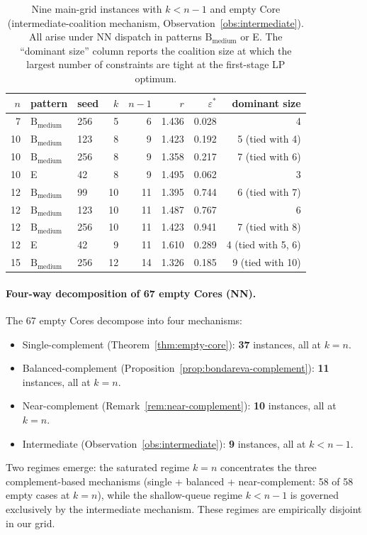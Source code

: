 \documentclass[11pt]{article}
\theoremstyle{plain}
\theoremstyle{definition}
\theoremstyle{remark}
\begin{document}
\begin{table}[h]
\centering
\small
\caption{Nine main-grid instances with $k<n-1$ and empty Core (intermediate-coalition mechanism, Observation~\ref{obs:intermediate}). All arise under NN dispatch in patterns $\text{B}_{\text{medium}}$ or E. The ``dominant size'' column reports the coalition size at which the largest number of constraints are tight at the first-stage LP optimum.}
\label{tab:intermediate}
\begin{tabular}{@{}rllrrrrr@{}}
\toprule
$n$ & pattern & seed & $k$ & $n-1$ & $r$ & $\varepsilon^{\ast}$ & dominant size \\
\midrule
 7 & $\text{B}_{\text{medium}}$ & 256 &  5 &  6 & 1.436 & 0.028 & 4 \\
10 & $\text{B}_{\text{medium}}$ & 123 &  8 &  9 & 1.423 & 0.192 & 5 (tied with 4) \\
10 & $\text{B}_{\text{medium}}$ & 256 &  8 &  9 & 1.358 & 0.217 & 7 (tied with 6) \\
10 & E                          &  42 &  8 &  9 & 1.495 & 0.062 & 3 \\
12 & $\text{B}_{\text{medium}}$ &  99 & 10 & 11 & 1.395 & 0.744 & 6 (tied with 7) \\
12 & $\text{B}_{\text{medium}}$ & 123 & 10 & 11 & 1.487 & 0.767 & 6 \\
12 & $\text{B}_{\text{medium}}$ & 256 & 10 & 11 & 1.423 & 0.941 & 7 (tied with 8) \\
12 & E                          &  42 &  9 & 11 & 1.610 & 0.289 & 4 (tied with 5, 6) \\
15 & $\text{B}_{\text{medium}}$ & 256 & 12 & 14 & 1.326 & 0.185 & 9 (tied with 10) \\
\bottomrule
\end{tabular}
\end{table}

\paragraph{Four-way decomposition of 67 empty Cores (NN).} The 67 empty Cores decompose into four mechanisms:
\begin{itemize}
  \item Single-complement (Theorem~\ref{thm:empty-core}): \textbf{37} instances, all at $k=n$.
  \item Balanced-complement (Proposition~\ref{prop:bondareva-complement}): \textbf{11} instances, all at $k=n$.
  \item Near-complement (Remark~\ref{rem:near-complement}): \textbf{10} instances, all at $k=n$.
  \item Intermediate (Observation~\ref{obs:intermediate}): \textbf{9} instances, all at $k<n-1$.
\end{itemize}
Two regimes emerge: the saturated regime $k=n$ concentrates the three complement-based mechanisms (single + balanced + near-complement: 58 of 58 empty cases at $k=n$), while the shallow-queue regime $k<n-1$ is governed exclusively by the intermediate mechanism. These regimes are empirically disjoint in our grid.
\end{document}
